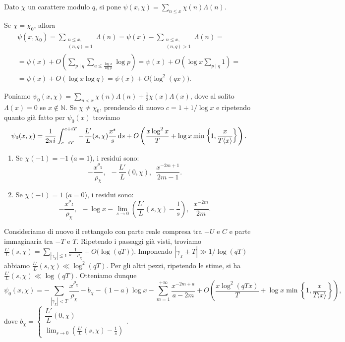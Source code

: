 \begin{defn}
  Dato $\chi$ un carattere modulo $q$, si pone $\displaystyle \psi(x,\chi)=\sum_{n \le x} \chi(n)\Lambda(n)$.
\end{defn}

\begin{oss}
  Se $\chi=\chi_0$, allora
  \begin{gather*}
    \psi(x,\chi_0)=\sum_{\substack{n \le x,\\ (n,q)=1}} \Lambda(n)=\psi(x)-\sum_{\substack{n \le x,\\ (n,q)>1}} \Lambda(n)= \\
    =\psi(x)+O\left(\sum_{p \mid q} \sum_{a \le \frac{\log{x}}{\log{p}}}\log{p}\right)=\psi(x)+O\left(\log{x}\sum_{p \mid q} 1\right)= \\
    =\psi(x)+O(\log{x}\log{q})=\psi(x)+O\big(\log^2(qx)\big).
  \end{gather*}
\end{oss}

Poniamo $\displaystyle \psi_0(x,\chi)=\sum_{n<x} \chi(n)\Lambda(n)+\frac{1}{2}\chi(x)\Lambda(x)$, dove al solito $\Lambda(x)=0$ se $x \not\in \mathbb{N}$. Se $\chi\not=\chi_0$, prendendo di nuovo $c=1+1/\log{x}$ e ripetendo quanto già fatto per $\psi_0(x)$ troviamo
$$\psi_0(x,\chi)=\frac{1}{2\pi i} \int_{c-iT}^{c+iT} -\frac{L'}{L}(s,\chi)\frac{x^s}{s}\mathop{}\!\mathrm{d} s+O\left(\frac{x\log^2{x}}{T}+\log{x}\min\left\{1,\frac{x}{T\langle x\rangle}\right\}\right).$$

\begin{enumerate}
  \item Se $\chi(-1)=-1$ ($a=1$), i residui sono:
  $$-\frac{x^{\rho_\chi}}{\rho_\chi}, \,\,\, -\frac{L'}{L}(0,\chi), \,\,\, \frac{x^{-2m+1}}{2m-1}.$$
  \item Se $\chi(-1)=1$ ($a=0$), i residui sono:
  $$-\frac{x^{\rho_\chi}}{\rho_\chi}, \,\,\, -\log{x}-\lim_{s \longrightarrow 0} \left(\frac{L'}{L}(s,\chi)-\frac{1}{s}\right), \,\,\, \frac{x^{-2m}}{2m}.$$
\end{enumerate}

Consideriamo di nuovo il rettangolo con parte reale compresa tra $-U$ e $C$ e parte immaginaria tra $-T$ e $T$. Ripetendo i passaggi già visti, troviamo $\displaystyle \frac{L'}{L}(s,\chi)=\sum_{|\gamma_\chi| \le 1} \frac{1}{s-\rho_\chi}+O\big(\log(qT)\big)$. Imponendo $|\gamma_\chi\pm T| \gg 1/\log(qT)$ abbiamo $\frac{L'}{L}(s,\chi) \ll \log^2(qT)$.
Per gli altri pezzi, ripetendo le stime, si ha $\frac{L'}{L}(s,\chi) \ll \log(qT)$. Otteniamo dunque
$$\psi_0(x,\chi)=-\sum_{|\gamma_\chi|<T} \frac{x^{\rho_\chi}}{\rho_\chi}-b_\chi-(1-a)\log{x}-\sum_{m=1}^{+\infty} \frac{x^{-2m+a}}{a-2m}+O\left(\frac{x\log^2(qTx)}{T}+\log{x}\min\left\{1,\frac{x}{T\langle x\rangle}\right\}\right),$$
dove $b_\chi=\begin{cases}
  \dfrac{L'}{L}(0,\chi) \\ \displaystyle\lim_{s \longrightarrow 0} \left(\frac{L'}{L}(s,\chi)-\frac{1}{s}\right)
\end{cases}$.

